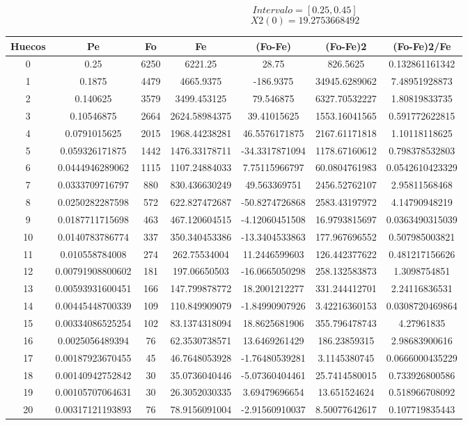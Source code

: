 \documentclass{article}
\begin{document}
$$
Intervalo = [0.25, 0.45]
$$
$$
X2(0) = 19.2753668492
$$
\begin{tabular}{|c|c|c|c|c|c|c|}
Huecos&Pe&Fo&Fe&(Fo{-}Fe)&(Fo{-}Fe)2&(Fo{-}Fe)2/Fe\\
\hline
0&0.25&6250&6221.25&28.75&826.5625&0.132861161342\\
\hline
1&0.1875&4479&4665.9375&{-}186.9375&34945.6289062&7.48951928873\\
\hline
2&0.140625&3579&3499.453125&79.546875&6327.70532227&1.80819833735\\
\hline
3&0.10546875&2664&2624.58984375&39.41015625&1553.16041565&0.591772622815\\
\hline
4&0.0791015625&2015&1968.44238281&46.5576171875&2167.61171818&1.10118118625\\
\hline
5&0.059326171875&1442&1476.33178711&{-}34.3317871094&1178.67160612&0.798378532803\\
\hline
6&0.0444946289062&1115&1107.24884033&7.75115966797&60.0804761983&0.0542610423329\\
\hline
7&0.0333709716797&880&830.436630249&49.563369751&2456.52762107&2.95811568468\\
\hline
8&0.0250282287598&572&622.827472687&{-}50.8274726868&2583.43197972&4.14790948219\\
\hline
9&0.0187711715698&463&467.120604515&{-}4.12060451508&16.9793815697&0.0363490315039\\
\hline
10&0.0140783786774&337&350.340453386&{-}13.3404533863&177.967696552&0.507985003821\\
\hline
11&0.010558784008&274&262.75534004&11.2446599603&126.442377622&0.481217156626\\
\hline
12&0.00791908800602&181&197.06650503&{-}16.0665050298&258.132583873&1.3098754851\\
\hline
13&0.00593931600451&166&147.799878772&18.2001212277&331.244412701&2.24116836531\\
\hline
14&0.00445448700339&109&110.849909079&{-}1.84990907926&3.42216360153&0.0308720469864\\
\hline
15&0.00334086525254&102&83.1374318094&18.8625681906&355.796478743&4.27961835\\
\hline
16&0.0025056489394&76&62.3530738571&13.6469261429&186.23859315&2.98683900616\\
\hline
17&0.00187923670455&45&46.7648053928&{-}1.76480539281&3.1145380745&0.0666000435229\\
\hline
18&0.00140942752842&30&35.0736040446&{-}5.07360404461&25.7414580015&0.733926800586\\
\hline
19&0.00105707064631&30&26.3052030335&3.69479696654&13.651524624&0.518966708092\\
\hline
20&0.00317121193893&76&78.9156091004&{-}2.91560910037&8.50077642617&0.107719835443\\
\end{tabular}
\end{document}
